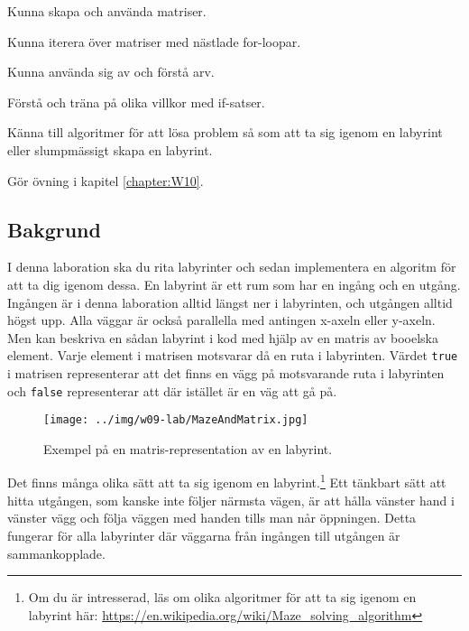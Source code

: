 
\Lab{\LabWeekTEN}

\begin{Goals}
\item Kunna skapa och använda matriser.
\item Kunna iterera över matriser med nästlade for-loopar.
\item Kunna använda sig av och förstå arv.
\item Förstå och träna på olika villkor med if-satser.
\item Känna till algoritmer för att lösa problem så som att ta sig igenom en labyrint eller slumpmässigt skapa en labyrint.
\end{Goals}

\begin{Preparations}
\item Gör övning {\tt \ExeWeekTEN} i kapitel \ref{chapter:W10}.
\end{Preparations}

\subsection{Bakgrund}

I denna laboration ska du rita labyrinter och sedan implementera en algoritm för att ta dig igenom dessa. En labyrint är ett rum som har en ingång och en utgång. Ingången är i denna laboration alltid längst ner i labyrinten, och utgången alltid högst upp. Alla väggar är också parallella med antingen x-axeln eller y-axeln. Men kan beskriva en sådan labyrint i kod med hjälp av en matris av booelska element. Varje element i matrisen motsvarar då en ruta i labyrinten. Värdet \texttt{true} i matrisen representerar att det finns en vägg på motsvarande ruta i labyrinten och \texttt{false} representerar att där istället är en väg att gå på.

\begin{figure}[h]
	\begin{center}
		\texttt{[image: ../img/w09-lab/MazeAndMatrix.jpg]}
	\end{center}
	\caption{Exempel på en matris-representation av en labyrint.}
\end{figure}

Det finns många olika sätt att ta sig igenom en labyrint.\footnote{Om du är intresserad, läs om olika algoritmer för att ta sig igenom en labyrint här: \url{https://en.wikipedia.org/wiki/Maze\_solving\_algorithm}} Ett tänkbart sätt att hitta utgången, som kanske inte följer närmsta vägen, är att hålla vänster hand i vänster vägg och följa väggen med handen tills man når öppningen. Detta fungerar för alla labyrinter där väggarna från ingången till utgången är sammankopplade.

